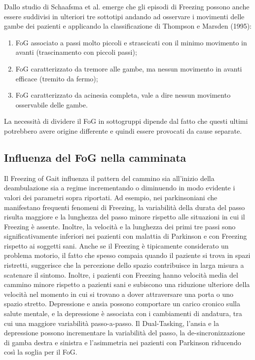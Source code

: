 Dallo studio di Schaafsma et al.\cite{30} emerge che gli episodi di Freezing possono anche essere suddivisi in ulteriori tre sottotipi andando ad osservare i movimenti delle gambe dei pazienti e applicando la classificazione di Thompson e Marsden (1995):
\begin{enumerate}
	\item FoG associato a passi molto piccoli e strascicati con il minimo movimento in avanti (trascinamento con piccoli passi);
	\item FoG caratterizzato da tremore alle gambe, ma nessun movimento in avanti efficace (tremito da fermo);
	\item FoG caratterizzato da acinesia completa, vale a dire nessun movimento osservabile delle gambe.
\end{enumerate}
La necessità di dividere il FoG in sottogruppi dipende dal fatto che questi ultimi potrebbero avere origine differente e quindi essere provocati da cause separate.
\subsection{Influenza del FoG nella camminata}
Il Freezing of Gait influenza il pattern del cammino sia all’inizio della deambulazione sia a regime incrementando o diminuendo in modo evidente i valori dei parametri sopra riportati. Ad esempio, nei parkinsoniani che manifestano frequenti fenomeni di Freezing, la variabilità della durata del passo risulta maggiore e la lunghezza del passo minore rispetto alle situazioni in cui il Freezing è assente. Inoltre, la velocità e la lunghezza dei primi tre passi sono significativamente inferiori nei pazienti con malattia di Parkinson e con Freezing rispetto ai soggetti sani. Anche se il Freezing è tipicamente considerato un problema motorio, il fatto che spesso compaia quando il paziente si trova in spazi ristretti, suggerisce che la percezione dello spazio contribuisce in larga misura a scatenare il sintomo\cite{37}. Inoltre, i pazienti con Freezing hanno velocità media del cammino minore rispetto a pazienti sani e subiscono una riduzione ulteriore della velocità nel momento in cui si trovano a dover attraversare una porta o uno spazio stretto. Depressione e ansia possono comportare un carico cronico sulla salute mentale, e la depressione è associata con i cambiamenti di andatura, tra cui una maggiore variabilità passo-a-passo. Il Dual-Tasking, l’ansia e la depressione possono incrementare la variabilità del passo, la de-sincronizzazione di gamba destra e sinistra e l'asimmetria nei pazienti con Parkinson riducendo così la soglia per il FoG. \\

